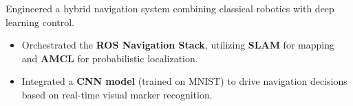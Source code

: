 Engineered a hybrid navigation system combining classical robotics with deep learning control.
\begin{itemize}
\item Orchestrated the \textbf{ROS Navigation Stack}, utilizing \textbf{SLAM} for mapping and \textbf{AMCL} for probabilistic localization.
\item Integrated a \textbf{CNN model} (trained on MNIST) to drive navigation decisions based on real-time visual marker recognition.
\end{itemize}
{\LaTeXraggedright
{}
\par}